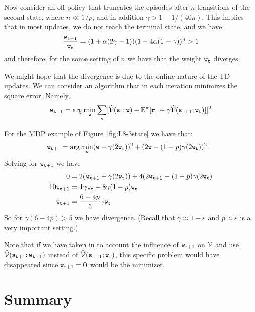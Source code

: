 Now consider an off-policy that truncates the episodes after $n$
transitions of the second state, where $n\ll 1/p$, and in addition
$\gamma> 1-1/(40n)$. This implies that in most updates, we do not
reach the terminal state, and we have
\[
\frac{{\tt w}_{{\tt t}+1}}{{\tt w}_{\tt t}}=(1+\alpha(2\gamma-1))(1-4\alpha(1-\gamma))^n>1
\]
and therefore, for the some setting of $n$ we have that the weight
${\tt w}_{\tt t}$ diverges.

We might hope that the divergence is due to the online nature of the
TD updates. We can consider an algorithm that in each iteration
minimizes the square error. Namely,
\[
{\tt w}_{{\tt t}+1}=\arg\min_{\tt w}\sum_s
[\widehat{\mathcal{V}}({\tt s}_{\tt t};{\tt w})-\mathbb{E}^\pi[{\tt r}_{\tt t}+\gamma\widehat{\mathcal{V}}({\tt s}_{{\tt t}+1};{\tt w}_{\tt t})]]^2
\]

For the MDP example of Figure~\ref{fig:L8-3state} we have that:
\begin{align*}
 {\tt w}_{{\tt t}+1} &= \arg\min_{\tt w} ({\tt w}-\gamma(2{\tt w}_{\tt t}))^2+(2{\tt w}-(1-p)\gamma(2{\tt w}_{\tt t}))^2
\end{align*}
Solving for ${\tt w}_{{\tt t}+1}$ we have
\begin{align*}
0&=  2({\tt w}_{{\tt t}+1}-\gamma(2{\tt w}_{\tt t}))+4(2{\tt w}_{{\tt t}+1}-(1-p)\gamma(2{\tt w}_{\tt t})\\
  10 {\tt w}_{{\tt t}+1}&=4\gamma {\tt w}_{\tt t} + 8\gamma(1-p){\tt w}_{\tt t}\\
  {\tt w}_{{\tt t}+1}&=\frac{6-4p}{5}\gamma {\tt w}_{\tt t}
\end{align*}
So for $\gamma(6-4p)>5$ we have divergence. (Recall that
$\gamma\approx 1-\varepsilon$ and $p\approx \varepsilon$ is a very
important setting.)

Note that if we have taken in to account the influence of
${\tt w}_{{\tt t}+1}$ on $\mathcal{V}$ and use
$\widehat{\mathcal{V}}({\tt s}_{{\tt t}+1};{\tt w}_{{\tt t}+1})$ instead of
$\widehat{\mathcal{V}}({\tt s}_{{\tt t}+1};{\tt w}_{\tt t})$, this specific
problem would have disappeared since ${\tt w}_{{\tt t}+1}=0$ would
be the minimizer.

\section{Summary}

